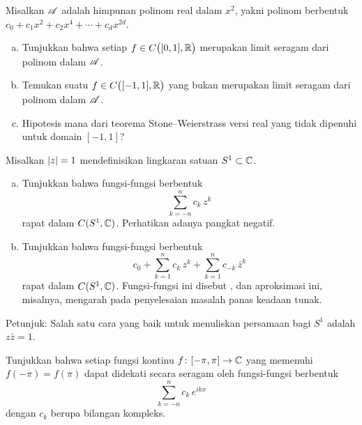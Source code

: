 \begin{exercise}
Misalkan ${\mathscr{A}}$ adalah himpunan polinom real dalam $x^2$,
yakni polinom berbentuk
$c_0 + c_1 x^2 + c_2 x^4 + \cdots + c_d x^{2d}$.
\begin{enumerate}[a)]
\item
Tunjukkan bahwa setiap $f \in C\bigl([0,1],{\mathbb{R}}\bigr)$ merupakan limit seragam
dari polinom dalam ${\mathscr{A}}$.
\item
Temukan suatu $f \in  C\bigl([-1,1],{\mathbb{R}}\bigr)$ yang bukan merupakan
limit seragam dari polinom dalam ${\mathscr{A}}$.
\item
Hipotesis mana dari teorema Stone--Weierstrass versi real yang tidak dipenuhi
untuk domain $[-1,1]$?
\end{enumerate}
\end{exercise}

\begin{exercise}
\pagebreak[3]
Misalkan $\lvert {z} \rvert=1$ mendefinisikan lingkaran satuan $S^1 \subset {\mathbb{C}}$.
\begin{enumerate}[a)]
\item
Tunjukkan bahwa fungsi-fungsi berbentuk
\begin{equation*}
\sum_{k=-n}^n c_k\, z^k
\end{equation*}
rapat dalam $C(S^1,{\mathbb{C}})$.  Perhatikan adanya pangkat negatif.
\item 
Tunjukkan bahwa fungsi-fungsi berbentuk
\begin{equation*}
c_0
+
\sum_{k=1}^n c_k \, z^k
+
\sum_{k=1}^n c_{-k}\, \bar{z}^k
\end{equation*}
rapat dalam $C(S^1,{\mathbb{C}})$.
Fungsi-fungsi ini disebut \emph{},
dan aproksimasi ini, misalnya, mengarah pada penyelesaian
masalah panas keadaan tunak.
\end{enumerate}
Petunjuk: Salah satu cara yang baik untuk menuliskan persamaan bagi $S^1$
adalah $z \bar{z} = 1$.
\end{exercise}

\begin{exercise} \label{exercise:trigpolydense}
Tunjukkan bahwa setiap fungsi kontinu $f \colon [-\pi,\pi] \to {\mathbb{C}}$
yang memenuhi $f(-\pi)=f(\pi)$ dapat didekati secara seragam oleh
fungsi-fungsi berbentuk
\begin{equation*}
\sum_{k=-n}^n c_k \, e^{ik x}
\end{equation*}
dengan $c_k$ berupa bilangan kompleks.
\end{exercise}

